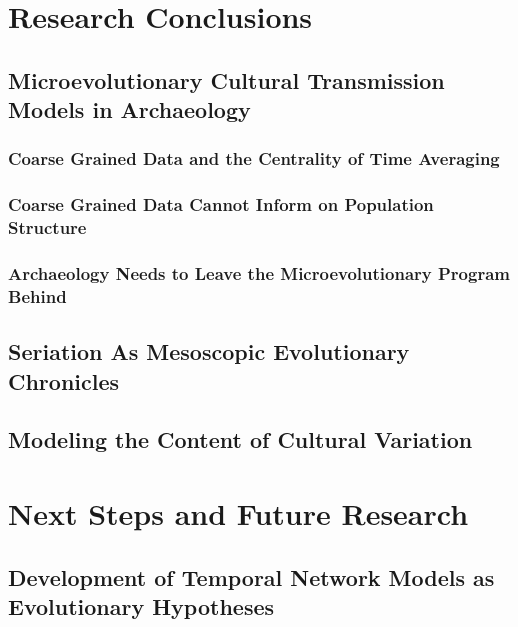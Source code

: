 


\section{Research Conclusions}\label{conc:sec:research-conclusions}

\subsection{Microevolutionary Cultural Transmission Models in Archaeology}\label{conc:sec:conc-microevolutionary}


\subsubsection{Coarse Grained Data and the Centrality of Time Averaging}\label{conc:sec:conc-timeaveraging}


\subsubsection{Coarse Grained Data Cannot Inform on Population Structure}\label{conc:sec:conc-ctmixtures}

\subsubsection{Archaeology Needs to Leave the Microevolutionary Program Behind}\label{conc:sec:leaving-behind}

\subsection{Seriation As Mesoscopic Evolutionary Chronicles}\label{conc:sec:conc-seriation}


\subsection{Modeling the Content of Cultural Variation}\label{conc:sec:conc-structured}

\section{Next Steps and Future Research}\label{conc:sec:future-research}


\subsection{Development of Temporal Network Models as Evolutionary Hypotheses}\label{conc:sec:future-temporal-networks}


